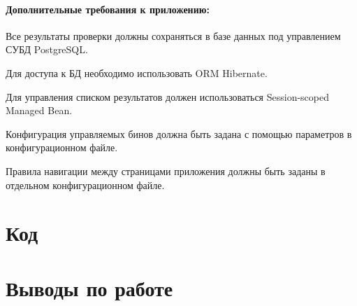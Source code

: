 \documentclass[a4paper, 12pt]{article}
\newenvironment{itemize*}%
  {\begin{itemize}%
    \setlength{\itemsep}{1pt}%
    \setlength{\parskip}{1pt}}%
  {\end{itemize}}
\begin{document}
\paragraph{Дополнительные требования к приложению:}
\begin{itemize*}
\item Все результаты проверки должны сохраняться в базе данных под управлением СУБД PostgreSQL.
\item Для доступа к БД необходимо использовать ORM Hibernate.
\item Для управления списком результатов должен использоваться Session-scoped Managed Bean.
\item Конфигурация управляемых бинов должна быть задана с помощью параметров в конфигурационном файле.
\item Правила навигации между страницами приложения должны быть заданы в отдельном конфигурационном файле.
\end{itemize*}

\newpage

\section{Код}

%
%
%
%
%
%

\section{Выводы по работе}

\end{document}
